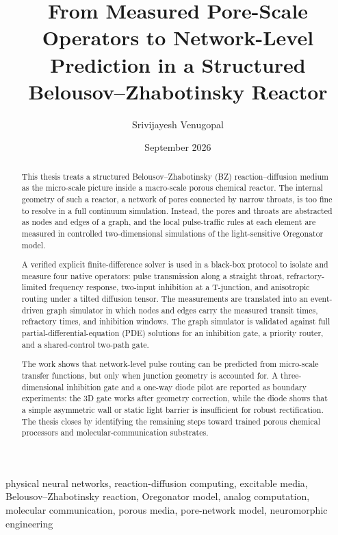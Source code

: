 \documentclass[12pt,oneside]{book}
\title{From Measured Pore-Scale Operators to Network-Level Prediction in a Structured Belousov--Zhabotinsky Reactor}
\author{Srivijayesh Venugopal}
\date{September 2026}
\begin{document}
\maketitle
\frontmatter

\begin{abstract}
This thesis treats a structured Belousov--Zhabotinsky (BZ) reaction--diffusion medium as the micro-scale picture inside a macro-scale porous chemical reactor.
The internal geometry of such a reactor, a network of pores connected by narrow throats, is too fine to resolve in a full continuum simulation.
Instead, the pores and throats are abstracted as nodes and edges of a graph, and the local pulse-traffic rules at each element are measured in controlled two-dimensional simulations of the light-sensitive Oregonator model.

A verified explicit finite-difference solver is used in a black-box protocol to isolate and measure four native operators: pulse transmission along a straight throat, refractory-limited frequency response, two-input inhibition at a T-junction, and anisotropic routing under a tilted diffusion tensor.
The measurements are translated into an event-driven graph simulator in which nodes and edges carry the measured transit times, refractory times, and inhibition windows.
The graph simulator is validated against full partial-differential-equation (PDE) solutions for an inhibition gate, a priority router, and a shared-control two-path gate.

The work shows that network-level pulse routing can be predicted from micro-scale transfer functions, but only when junction geometry is accounted for.
A three-dimensional inhibition gate and a one-way diode pilot are reported as boundary experiments: the 3D gate works after geometry correction, while the diode shows that a simple asymmetric wall or static light barrier is insufficient for robust rectification.
The thesis closes by identifying the remaining steps toward trained porous chemical processors and molecular-communication substrates.
\end{abstract}

\begin{keywords}
physical neural networks, reaction-diffusion computing, excitable media,
Belousov--Zhabotinsky reaction, Oregonator model, analog computation,
molecular communication, porous media, pore-network model, neuromorphic engineering
\end{keywords}

\end{document}
